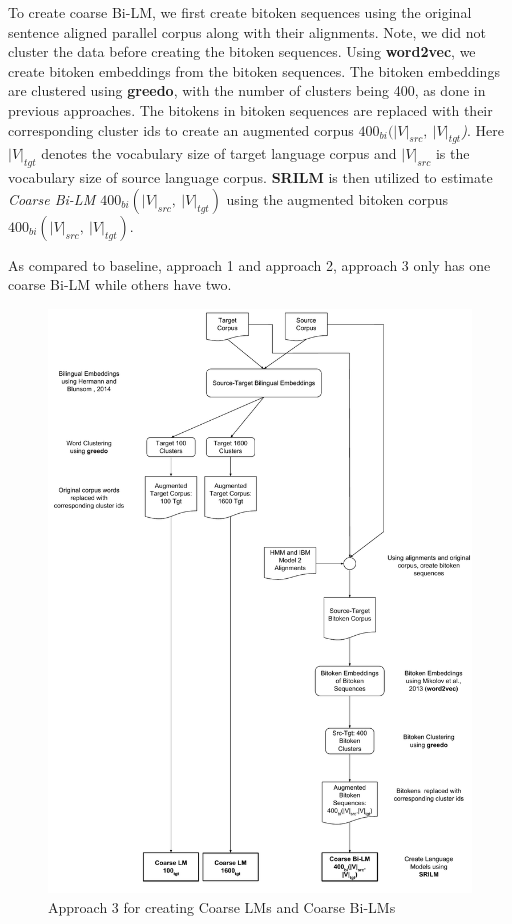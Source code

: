 To create coarse Bi-LM, we first create bitoken sequences using the original sentence aligned parallel corpus along with their alignments. Note, we did not cluster the data before creating the bitoken sequences. Using \textbf{word2vec}, we create bitoken embeddings from the bitoken sequences. The bitoken embeddings are clustered using \textbf{greedo}, with the number of clusters being 400, as done in previous approaches. The bitokens in bitoken sequences are replaced with their corresponding cluster ids to create an augmented corpus \textit{$400_{bi}(|V|_{src},\ |V|_{tgt}$)}. Here \textit{$|V|_{tgt}$} denotes the vocabulary size of target language corpus and \textit{$|V|_{src}$} is the vocabulary size of source language corpus. \textbf{SRILM} is then utilized to estimate \textit{Coarse Bi-LM $400_{bi}(|V|_{src},\ |V|_{tgt})$} using the augmented bitoken corpus \textit{$400_{bi}(|V|_{src},\ |V|_{tgt})$}.

As compared to baseline, approach 1 and approach 2, approach 3 only has one coarse Bi-LM while others have two.

\begin{figure}[htbp]
	\begin{center}
		\includegraphics[width=\textwidth]{files/images/idea3}
	\end{center}
	\caption{Approach 3 for creating Coarse LMs and Coarse Bi-LMs}
	\label{fig:idea3}
\end{figure}

